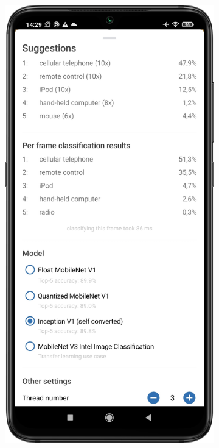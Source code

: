 \documentclass[
			   fontsize=11pt,
               paper=a4,
               bibliography=totoc,
               idxtotoc,
               headsepline,
               footsepline,
               footinclude=false,
               BCOR=12mm,
               DIV=13,
               openany,   %
               oneside    %
               ]
               {scrbook}
\begin{document}
\begin{figure}[H]
	\bigskip
	\begin{subfigure}{.23\textwidth}
		\centering
		\includegraphics[width=\linewidth]{figures/app_class_sheet_old.png}

\end{subfigure}
\end{figure}
\end{document}
